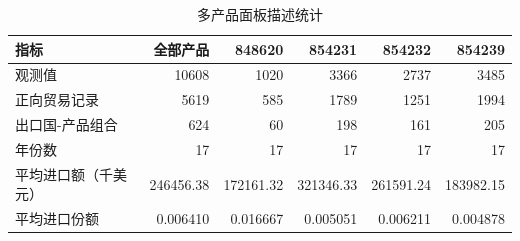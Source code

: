 \begin{table}[H]
\centering
\caption{多产品面板描述统计}
\label{tab:descriptive}
\begin{tabular}{lrrrrr}
\toprule
指标 & 全部产品 & 848620 & 854231 & 854232 & 854239 \\
\midrule
观测值 & 10608 & 1020 & 3366 & 2737 & 3485 \\
正向贸易记录 & 5619 & 585 & 1789 & 1251 & 1994 \\
出口国-产品组合 & 624 & 60 & 198 & 161 & 205 \\
年份数 & 17 & 17 & 17 & 17 & 17 \\
平均进口额（千美元） & 246456.38 & 172161.32 & 321346.33 & 261591.24 & 183982.15 \\
平均进口份额 & 0.006410 & 0.016667 & 0.005051 & 0.006211 & 0.004878 \\
\bottomrule
\end{tabular}
\end{table}
